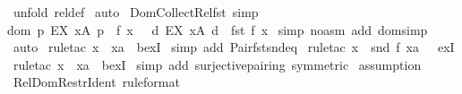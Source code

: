\begin{isabellebody}
%
\isadelimproof
%
\endisadelimproof
%
\isatagproof
{}\isamarkupfalse%
\ {\isacharparenleft}unfold\ rel{\isacharunderscore}def{\isacharparenright}\isanewline
{}\isamarkupfalse%
\ auto\isanewline
{}\isamarkupfalse%
%
\endisatagproof
{\isafoldproof}%
%
\isadelimproof
\isanewline
%
\endisadelimproof
\isanewline
{}\isamarkupfalse%
\ Dom{\isacharunderscore}Collect{\isacharunderscore}Rel{\isacharunderscore}fst\ {\isacharbrackleft}simp{\isacharbrackright}{\isacharcolon}\ \isanewline
{\isachardoublequoteopen}dom\ {\isacharbraceleft}p{\isachardot}\ EX\ x{\isacharcolon}A{\isachardot}\ p\ {\isacharequal}\ {\isacharparenleft}f\ x{\isacharparenright}\ {\isacharbraceright}\ {\isacharequal}\ {\isacharbraceleft}d{\isachardot}\ EX\ x{\isacharcolon}A{\isachardot}\ d\ {\isacharequal}\ fst\ {\isacharparenleft}f\ x{\isacharparenright}{\isacharbraceright}{\isachardoublequoteclose}\isanewline
%
\isadelimproof
%
\endisadelimproof
%
\isatagproof
{}\isamarkupfalse%
\ {\isacharparenleft}simp\ {\isacharparenleft}no{\isacharunderscore}asm{\isacharparenright}\ add{\isacharcolon}\ dom{\isacharunderscore}simp{\isacharparenright}\isanewline
{}\isamarkupfalse%
\ auto\isanewline
{}\isamarkupfalse%
\ {\isacharparenleft}rule{\isacharunderscore}tac\ x\ {\isacharequal}\ {\isachardoublequoteopen}xa{\isachardoublequoteclose}\ \ bexI{\isacharparenright}\isanewline
{}\isamarkupfalse%
\ {\isacharparenleft}simp\ add{\isacharcolon}\ Pair{\isacharunderscore}fst{\isacharunderscore}snd{\isacharunderscore}eq{\isacharparenright}{\isacharplus}\isanewline
{}\isamarkupfalse%
\ {\isacharparenleft}rule{\isacharunderscore}tac\ x\ {\isacharequal}\ {\isachardoublequoteopen}snd\ {\isacharparenleft}f\ xa{\isacharparenright}\ {\isachardoublequoteclose}\ \ exI{\isacharparenright}\isanewline
{}\isamarkupfalse%
\ {\isacharparenleft}rule{\isacharunderscore}tac\ x\ {\isacharequal}\ {\isachardoublequoteopen}xa{\isachardoublequoteclose}\ \ bexI{\isacharparenright}\isanewline
{}\isamarkupfalse%
\ {\isacharparenleft}simp\ add{\isacharcolon}\ surjective{\isacharunderscore}pairing\ {\isacharbrackleft}symmetric{\isacharbrackright}{\isacharparenright}\isanewline
{}\isamarkupfalse%
\ assumption\isanewline
{}\isamarkupfalse%
%
\endisatagproof
{\isafoldproof}%
%
\isadelimproof
\isanewline
%
\endisadelimproof
\isanewline
{}\isamarkupfalse%
\ Rel{\isacharunderscore}Dom{\isacharunderscore}Restr{\isacharunderscore}Ident\ {\isacharbrackleft}rule{\isacharunderscore}format{\isacharbrackright}{\isacharcolon}\ \isanewline

\end{isabellebody}
